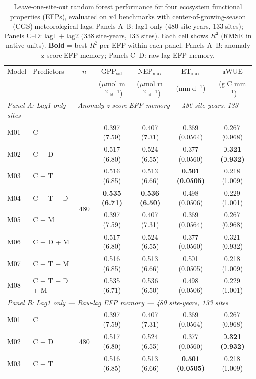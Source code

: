 \begin{table}[htbp]
\centering
\caption{Leave-one-site-out random forest performance for four ecosystem
functional properties (EFPs), evaluated on v4 benchmarks with center-of-growing-season (CGS)
meteorological lags. Panels A--B: lag1 only (480 site-years, 133 sites);
Panels C--D: lag1 + lag2 (338 site-years, 133 sites). Each cell shows $R^2$ (RMSE in
native units). \textbf{Bold} = best $R^2$ per EFP within each panel.
Panels A--B: anomaly z-score EFP memory; Panels C--D: raw-lag EFP memory.}
\label{tab:RF_LOSO_v4}
\footnotesize
\begin{tabular}{llccccc}
\toprule
Model & Predictors & $n$ & GPP$_\mathrm{sat}$ & NEP$_\mathrm{max}$ & ET$_\mathrm{max}$ & uWUE \\
  &  &  & ($\mu$mol m$^{-2}$ s$^{-1}$) & ($\mu$mol m$^{-2}$ s$^{-1}$) & (mm d$^{-1}$) & (g C mm$^{-1}$) \\
\midrule
\multicolumn{7}{l}{\textit{Panel A: Lag1 only --- Anomaly z-score EFP memory --- 480 site-years, 133 sites}} \\
\midrule
M01 & C & \multirow{8}{*}{480} & 0.397 (7.59) & 0.407 (7.31) & 0.369 (0.0564) & 0.267 (0.968) \\
M02 & C + D &  & 0.517 (6.80) & 0.524 (6.55) & 0.377 (0.0560) & \textbf{0.321 (0.932)} \\
M03 & C + T &  & 0.516 (6.85) & 0.513 (6.66) & \textbf{0.501 (0.0505)} & 0.218 (1.009) \\
M04 & C + T + D &  & \textbf{0.535 (6.71)} & \textbf{0.536 (6.50)} & 0.498 (0.0506) & 0.229 (1.001) \\
M05 & C + M &  & 0.397 (7.59) & 0.407 (7.31) & 0.369 (0.0564) & 0.267 (0.968) \\
M06 & C + D + M &  & 0.517 (6.80) & 0.524 (6.55) & 0.377 (0.0560) & 0.321 (0.932) \\
M07 & C + T + M &  & 0.516 (6.85) & 0.513 (6.66) & 0.501 (0.0505) & 0.218 (1.009) \\
M08 & C + T + D + M &  & 0.535 (6.71) & 0.536 (6.50) & 0.498 (0.0506) & 0.229 (1.001) \\
\midrule
\multicolumn{7}{l}{\textit{Panel B: Lag1 only --- Raw-lag EFP memory --- 480 site-years, 133 sites}} \\
\midrule
M01 & C & \multirow{8}{*}{480} & 0.397 (7.59) & 0.407 (7.31) & 0.369 (0.0564) & 0.267 (0.968) \\
M02 & C + D &  & 0.517 (6.80) & 0.524 (6.55) & 0.377 (0.0560) & \textbf{0.321 (0.932)} \\
M03 & C + T &  & 0.516 (6.85) & 0.513 (6.66) & \textbf{0.501 (0.0505)} & 0.218 (1.009) \\

\end{tabular}
\end{table}
